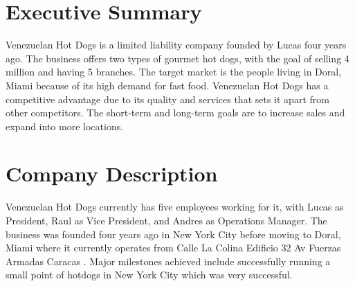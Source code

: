 

\section{Executive Summary}\label{sec:executive-summary}
Venezuelan Hot Dogs is a limited liability company founded by Lucas four years ago. The business offers two types of gourmet hot dogs, with the goal of selling 4 million and having 5 branches. The target market is the people living in Doral, Miami because of its high demand for fast food. Venezuelan Hot Dogs has a competitive advantage due to its quality and services that sets it apart from other competitors. The short-term and long-term goals are to increase sales and expand into more locations. 


 \section{Company Description}\label{sec:company-description}
Venezuelan Hot Dogs currently has five employees working for it, with Lucas as President, Raul as Vice President, and Andres as Operations Manager. The business was founded four years ago in New York City before moving to Doral, Miami where it currently operates from Calle La Colina Edificio 32 Av Fuerzas Armadas Caracas . Major milestones achieved include successfully running a small point of hotdogs in New York City which was very successful. 


